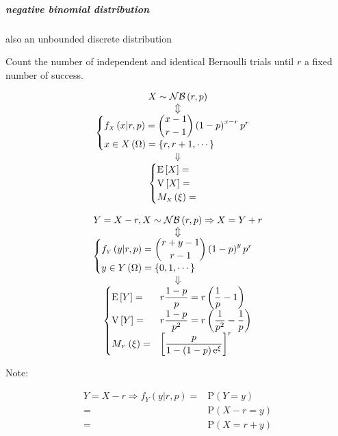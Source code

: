\documentclass[
]{book}
\theoremstyle{definition}
\theoremstyle{definition}
\theoremstyle{definition}
\theoremstyle{definition}
\theoremstyle{remark}
\begin{document}
\subparagraph{negative binomial distribution}\label{negative-binomial-distribution}

also an unbounded discrete distribution

Count the number of independent and identical Bernoulli trials until \(r\) a fixed number of success.

\[
\begin{array}{c}
X\sim\mathcal{NB}\left(r,p\right)\\
\Updownarrow\\
\begin{cases}
f_{{\scriptscriptstyle X}}\left(x|r,p\right)=\dbinom{x-1}{r-1}\left(1-p\right)^{x-r}p^{r}\\
x\in X\left(\Omega\right)=\left\{ r,r+1,\cdots\right\} 
\end{cases}\\
\Downarrow\\
\begin{cases}
\mathrm{E}\left[X\right]=\\
\mathrm{V}\left[X\right]=\\
M_{{\scriptscriptstyle X}}\left(\xi\right)=
\end{cases}
\end{array}
\]

\[
\begin{array}{c}
Y=X-r,X\sim\mathcal{NB}\left(r,p\right)\Rightarrow X=Y+r\\
\Updownarrow\\
\begin{cases}
f_{{\scriptscriptstyle Y}}\left(y|r,p\right)=\dbinom{r+y-1}{r-1}\left(1-p\right)^{y}p^{r}\\
y\in Y\left(\Omega\right)=\left\{ 0,1,\cdots\right\} 
\end{cases}\\
\Downarrow\\
\begin{cases}
\mathrm{E}\left[Y\right]= & r\dfrac{1-p}{p}=r\left(\dfrac{1}{p}-1\right)\\
\mathrm{V}\left[Y\right]= & r\dfrac{1-p}{p^{2}}=r\left(\dfrac{1}{p^{2}}-\dfrac{1}{p}\right)\\
M_{{\scriptscriptstyle Y}}\left(\xi\right)= & \left[\dfrac{p}{1-\left(1-p\right)\mathrm{e}^{\xi}}\right]^{r}
\end{cases}
\end{array}
\]

Note:

\[
\begin{aligned}
Y=X-r\Rightarrow f_{{\scriptscriptstyle Y}}\left(y|r,p\right)= & \mathrm{P}\left(Y=y\right)\\
= & \mathrm{P}\left(X-r=y\right)\\
= & \mathrm{P}\left(X=r+y\right)
\end{aligned}
\]
\end{document}
